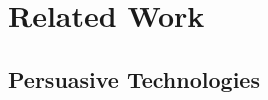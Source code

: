 
\chapter{Related Work} %

\label{relatedworkchapter} %


\section{Persuasive Technologies}

\begin{flushright}
\end{flushright}
